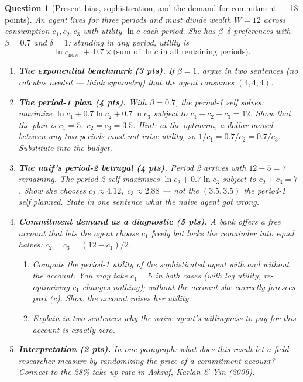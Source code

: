 \documentclass[11pt]{article}
\newtheorem{question}{Question}
\begin{document}
\begin{question}[Present bias, sophistication, and the demand for
commitment --- 18 points]
An agent lives for three periods and must divide wealth $W = 12$ across
consumption $c_1, c_2, c_3$ with utility $\ln c$ each period. She has
$\beta$--$\delta$ preferences with $\beta = 0.7$ and $\delta = 1$: standing
in any period, utility is
\[
  \ln c_{\text{now}} \;+\; 0.7 \times \big(\text{sum of } \ln c
  \text{ in all remaining periods}\big).
\]

\begin{enumerate}[label=(\alph*)]
  \item \textbf{The exponential benchmark (3 pts).} If $\beta = 1$, argue in
        two sentences (no calculus needed --- think symmetry) that the agent
        consumes $(4, 4, 4)$.
  \item \textbf{The period-1 plan (4 pts).} With $\beta = 0.7$, the period-1
        self solves: maximize $\ln c_1 + 0.7\ln c_2 + 0.7\ln c_3$ subject to
        $c_1 + c_2 + c_3 = 12$. Show that the plan is
        $c_1 = 5,\; c_2 = c_3 = 3.5$.
        \emph{Hint: at the optimum, a dollar moved between any two periods
        must not raise utility, so $1/c_1 = 0.7/c_2 = 0.7/c_3$. Substitute
        into the budget.}
  \item \textbf{The naif's period-2 betrayal (4 pts).} Period 2 arrives with
        $12 - 5 = 7$ remaining. The period-2 self maximizes
        $\ln c_2 + 0.7 \ln c_3$ subject to $c_2 + c_3 = 7$. Show she chooses
        $c_2 \approx 4.12,\; c_3 \approx 2.88$ --- not the $(3.5, 3.5)$ the
        period-1 self planned. State in one sentence what the naive agent got
        wrong.
  \item \textbf{Commitment demand as a diagnostic (5 pts).} A bank offers a
        free account that lets the agent choose $c_1$ freely but locks the
        remainder into equal halves: $c_2 = c_3 = (12 - c_1)/2$.
        \begin{enumerate}[label=(\roman*)]
          \item Compute the period-1 utility of the \emph{sophisticated}
                agent with and without the account. You may take $c_1 = 5$
                in both cases (with log utility, re-optimizing $c_1$ changes
                nothing); without the account she correctly foresees
                part (c). Show the account raises her utility.
          \item Explain in two sentences why the \emph{naive} agent's
                willingness to pay for this account is exactly zero.
        \end{enumerate}
  \item \textbf{Interpretation (2 pts).} In one paragraph: what does this
        result let a field researcher \emph{measure} by randomizing the
        \emph{price} of a commitment account? Connect to the 28\% take-up
        rate in Ashraf, Karlan \& Yin (2006).
\end{enumerate}
\end{question}
\end{document}
